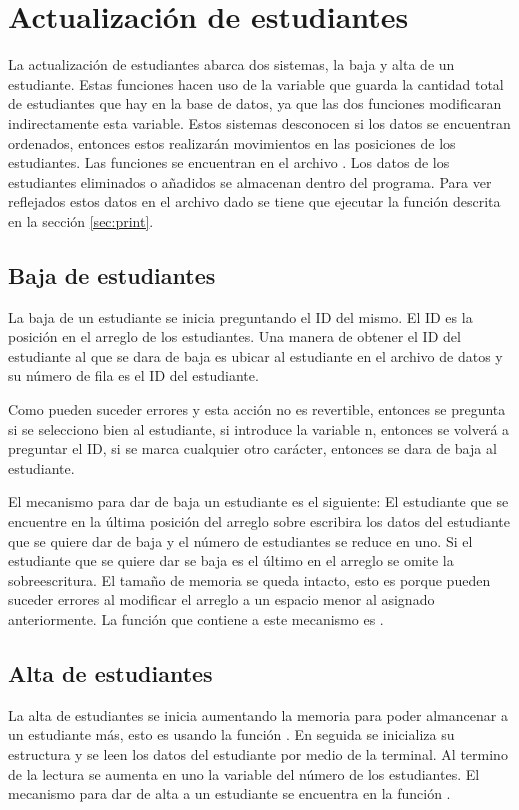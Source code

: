 \section{Actualización de estudiantes}

La actualización de estudiantes abarca dos sistemas, la baja y alta de un estudiante. Estas funciones hacen uso de la variable que guarda la cantidad total de estudiantes que hay en la base de datos, ya que las dos funciones modificaran indirectamente esta variable. Estos sistemas desconocen si los datos se encuentran ordenados, entonces estos realizarán movimientos en las posiciones de los estudiantes. Las funciones se encuentran en el archivo . Los datos de los estudiantes eliminados o añadidos se almacenan dentro del programa. Para ver reflejados estos datos en el archivo dado se tiene que ejecutar la función descrita en la sección \ref{sec:print}.

\subsection{Baja de estudiantes}

La baja de un estudiante se inicia preguntando el ID del mismo. El ID es la posición en el arreglo de los estudiantes. Una manera de obtener el ID del estudiante al que se dara de baja es ubicar al estudiante en el archivo de datos y su número de fila es el ID del estudiante.

Como pueden suceder errores y esta acción no es revertible, entonces se pregunta si se
selecciono bien al estudiante, si introduce la variable n, entonces se volverá a preguntar el ID, si se marca cualquier otro carácter, entonces se dara de baja al estudiante.

El mecanismo para dar de baja un estudiante es el siguiente: El estudiante que se encuentre en la última posición del arreglo sobre escribira los datos del estudiante que se quiere dar de baja y el número de estudiantes se reduce en uno. Si el estudiante que se quiere dar se baja es el último en el arreglo se omite la sobreescritura. El tamaño de memoria se queda intacto, esto es porque pueden suceder errores al modificar el arreglo a un espacio menor al asignado anteriormente. La función que contiene a este mecanismo es .

\subsection{Alta de estudiantes}

La alta de estudiantes se inicia aumentando la memoria para poder almancenar a un estudiante más, esto es usando la función . En seguida se inicializa su estructura y se leen los datos del estudiante por medio de la terminal. Al termino de la lectura se aumenta en uno la variable del número de los estudiantes. El mecanismo para dar de alta a un estudiante se encuentra en la función .
